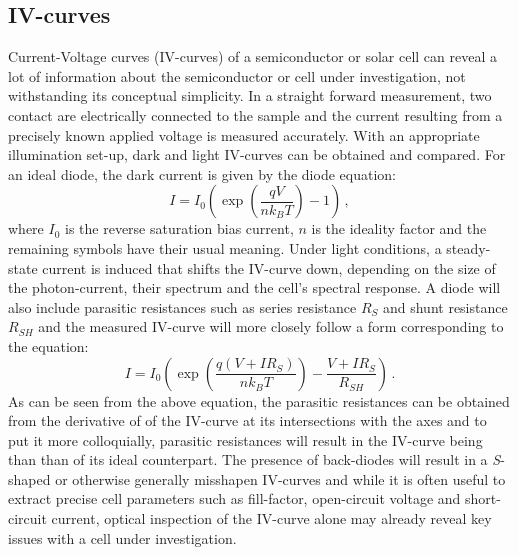 \subsection{IV-curves}
Current-Voltage curves (IV-curves) of a semiconductor or solar cell can reveal a lot of information about the semiconductor or cell under investigation, not withstanding its conceptual simplicity. In a straight forward measurement, two contact are electrically connected to the sample and the current resulting from a precisely known applied voltage is measured accurately. With an appropriate illumination set-up, dark and light IV-curves can be obtained and compared. For an ideal diode, the dark current is given by the diode equation:
\begin{equation}
	I = I_0 \left( \exp \left( \frac{qV}{nk_BT} \right) -1 \right) \, ,
\end{equation}
where $I_0$ is the reverse saturation bias current, $n$ is the ideality factor and the remaining symbols have their usual meaning. Under light conditions, a steady-state current is induced that shifts the IV-curve down, depending on the size of the photon-current, their spectrum and the cell's spectral response. A  diode will also include parasitic resistances such as series resistance $R_S$ and shunt resistance $R_{SH}$ and the measured IV-curve will more closely follow a form corresponding to the equation:
\begin{equation}
	I = I_0 \left( \exp \left( \frac{q(V+IR_S)}{nk_BT} \right) -\frac{V+IR_S}{R_{SH}} \right) \, .
\end{equation}
As can be seen from the above equation, the parasitic resistances can be obtained from the derivative of of the IV-curve at its intersections with the axes and to put it more colloquially, parasitic resistances will result in the IV-curve being  than than of its ideal counterpart. The presence of back-diodes will result in a \emph{S}-shaped or otherwise generally misshapen IV-curves and while it is often useful to extract precise cell parameters such as fill-factor, open-circuit voltage and short-circuit current, optical inspection of the IV-curve alone may already reveal key issues with a cell under investigation.

